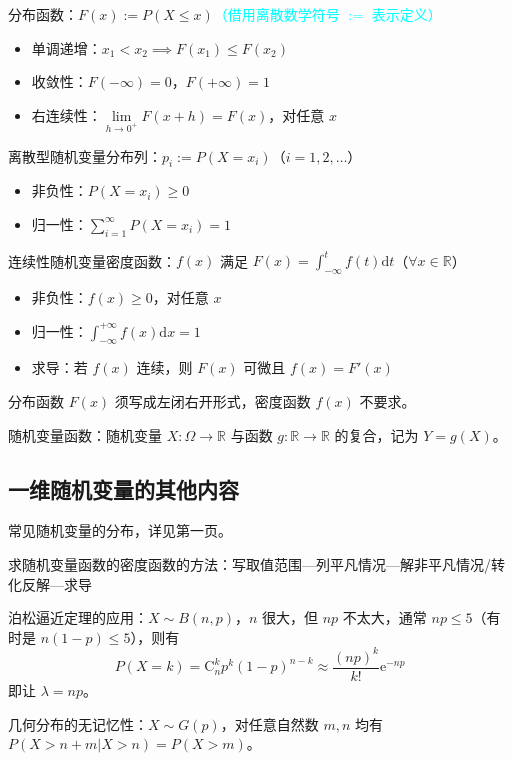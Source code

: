 \documentclass[UTF8]{ctexart}
\newcommand\Concept[1]{\textcolor{cyan!70!black}{#1}}
\newcommand\C{\mathrm{C}}
\newcommand\e{\mathrm{e}}
\renewcommand\d{\mathrm{d}}
\begin{document}
\Concept{分布函数}：$F(x) := P(X\leqslant x)$\textcolor{cyan}{（借用离散数学符号 $:=$ 表示定义）}
\begin{itemize}[itemsep=0pt,parsep=0pt]
  \item 单调递增：$x_1<x_2 \implies F(x_1)\leqslant F(x_2)$
  \item 收敛性：$F(-\infty) = 0$，$F(+\infty) = 1$
  \item 右连续性：$\lim\limits_{h\to 0^+} F(x+h) = F(x)$，对任意 $x$
\end{itemize}

离散型随机变量\Concept{分布列}：$p_i := P(X=x_i)$（$i=1,2,\dots$）
\begin{itemize}[itemsep=0pt,parsep=0pt]
  \item 非负性：$P(X=x_i)\geqslant 0$
  \item 归一性：$\sum_{i=1}^\infty  P(X=x_i) = 1$
\end{itemize}

连续性随机变量\Concept{密度函数}：$f(x)$ 满足 $\displaystyle F(x)=\int_{-\infty}^t f(t)\d t$（$\forall x\in \mathbb{R}$）
\begin{itemize}[itemsep=0pt,parsep=0pt]
  \item 非负性：$f(x)\geqslant 0$，对任意 $x$
  \item 归一性：$\displaystyle\int_{-\infty}^{+\infty} f(x)\d x=1$
  \item 求导：若 $f(x)$ 连续，则 $F(x)$ 可微且 $f(x)=F'(x)$
\end{itemize}
分布函数 $F(x)$ 须写成左闭右开形式，密度函数 $f(x)$ 不要求。

\Concept{随机变量函数}：随机变量 $X:\varOmega\to\mathbb{R}$ 与函数 $g:\mathbb{R}\to\mathbb{R}$ 的复合，记为 $Y=g(X)$。

\subsection{一维随机变量的其他内容}
常见随机变量的分布，详见第一页。

求随机变量函数的密度函数的方法：写取值范围—列平凡情况—解非平凡情况/转化反解—求导

泊松逼近定理的应用：$X\sim B(n,p)$，$n$ 很大，但 $np$ 不太大，通常 $np\leqslant 5$（有时是 $n(1-p)\leqslant 5$），则有
\begin{equation}\label{eq:泊松逼近定理}
    P(X=k) = \C_n^k p^k (1-p)^{n-k} \approx \dfrac{(np)^k}{k!}\e^{-np}
\end{equation}
即让 $\lambda=np$。

几何分布的无记忆性：$X\sim G(p)$，对任意自然数 $m,n$ 均有 $P(X>n+m|X>n) = P(X>m)$。
\end{document}
